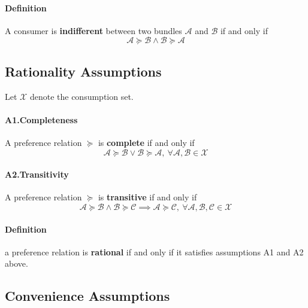 \documentclass{article}
\newcommand{\mc}[1]{\mathcal{#1}}
\begin{document}
			\paragraph{Definition} A consumer is \textbf{indifferent} between two bundles $\mc{A}$ and $\mc{B}$ if and only if
				\[
					\mc{A} \succcurlyeq \mc{B} \land \mc{B} \succcurlyeq \mc{A}
				\]
		
		\subsection{Rationality Assumptions}
			Let $\mc{X}$ denote the consumption set.
			\paragraph{A1.Completeness} A preference relation $\succcurlyeq$ is \textbf{complete} if and only if
				\[
					\mc{A} \succcurlyeq \mc{B} \lor \mc{B} \succcurlyeq \mc{A},\ \forall \mc{A},\mc{B} \in \mc{X}
				\]
			\paragraph{A2.Transitivity} A preference relation $\succcurlyeq$ is \textbf{transitive} if and only if
				\[
					\mc{A} \succcurlyeq \mc{B} \land \mc{B} \succcurlyeq \mc{C} \implies \mc{A} \succcurlyeq \mc{C},\ \forall \mc{A},\mc{B},\mc{C} \in \mc{X}
				\]
			\paragraph{Definition} a preference relation is \textbf{rational} if and only if it satisfies assumptions A1 and A2 above.
			
		\subsection{Convenience Assumptions}
\end{document}
